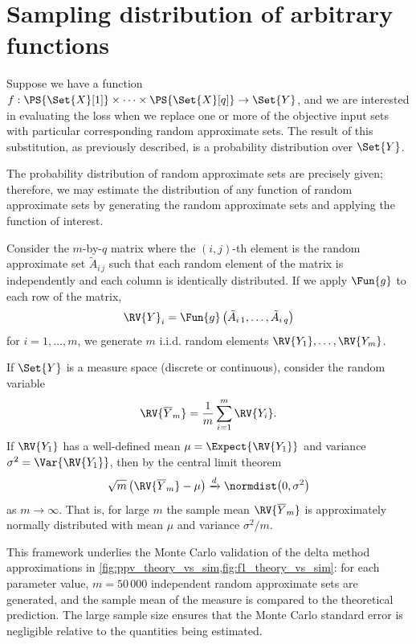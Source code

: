 \section{Sampling distribution of arbitrary functions}
\label{app:samp}
Suppose we have a function $f : \PS{\Set{X}[1]} \times \cdots \times \PS{\Set{X}[q]} \to \Set{Y}$, and we are interested in evaluating the loss when we replace one or more of the objective input sets with particular corresponding random approximate sets.
The result of this substitution, as previously described, is a probability distribution over $\Set{Y}$.

The probability distribution of random approximate sets are precisely given; therefore, we may estimate the distribution of any function of random approximate sets by generating the random approximate sets and applying the function of interest.

Consider the $m$-by-$q$ matrix where the $(i,j)$-th element is the random approximate set $\tilde{A}_{i\,j}$ such that each random element of the matrix is independently and each column is identically distributed.
If we apply $\Fun{g}$ to each row of the matrix,
\begin{equation}
\RV{Y}_i = \Fun{g}\left(\tilde{A}_{i\,1},\ldots,\tilde{A}_{i\,q}\right)
\end{equation}
for $i=1,\ldots,m$, we generate $m$ i.i.d. random elements $\RV{Y_1},\ldots,\RV{Y_m}$.

If $\Set{Y}$ is a measure space (discrete or continuous), consider the random variable
\begin{equation}
\RV{\overline{Y}_m} = \frac{1}{m} \sum_{i=1}^m \RV{Y_i}.
\end{equation}
If $\RV{Y_1}$ has a well-defined mean $\mu = \Expect{\RV{Y_1}}$ and variance $\sigma^2 = \Var{\RV{Y_1}}$, then by the central limit theorem
\begin{equation}
\sqrt{m}\left(\RV{\overline{Y}_m} - \mu\right) \xrightarrow{d} \normdist\!\left(0, \sigma^2\right)
\end{equation}
as $m \to \infty$.
That is, for large $m$ the sample mean $\RV{\overline{Y}_m}$ is approximately normally distributed with mean $\mu$ and variance $\sigma^2 / m$.

This framework underlies the Monte Carlo validation of the delta method approximations in \cref{fig:ppv_theory_vs_sim,fig:f1_theory_vs_sim}: for each parameter value, $m = 50\,000$ independent random approximate sets are generated, and the sample mean of the measure is compared to the theoretical prediction.
The large sample size ensures that the Monte Carlo standard error is negligible relative to the quantities being estimated.
